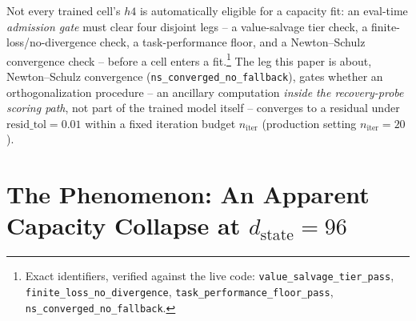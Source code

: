 \documentclass[10pt,letterpaper]{article}
\newcommand{\dstate}{d_{\mathrm{state}}}
\newcommand{\niter}{n_{\mathrm{iter}}}
\begin{document}
Not every trained cell's $h4$ is automatically eligible for a capacity
fit: an eval-time \emph{admission gate} must clear four disjoint legs --
a value-salvage tier check, a finite-loss/no-divergence check, a
task-performance floor, and a Newton--Schulz convergence check -- before
a cell enters a fit.\footnote{Exact identifiers, verified against the
live code:
\texttt{value\_salvage\_tier\_pass},
\texttt{finite\_loss\_no\_divergence},
\texttt{task\_performance\_floor\_pass},
\texttt{ns\_converged\_no\_fallback}.}
The leg this paper is about, Newton--Schulz convergence
(\texttt{ns\_converged\_no\_fallback}), gates whether an orthogonalization
procedure -- an ancillary computation \emph{inside the recovery-probe
scoring path}, not part of the trained model itself -- converges to a
residual under $\mathrm{resid\_tol}=0.01$ within a fixed iteration budget
$\niter$ (production setting $\niter=20$).

\section{The Phenomenon: An Apparent Capacity Collapse at $\dstate=96$}
\label{sec:phenomenon}
\end{document}
